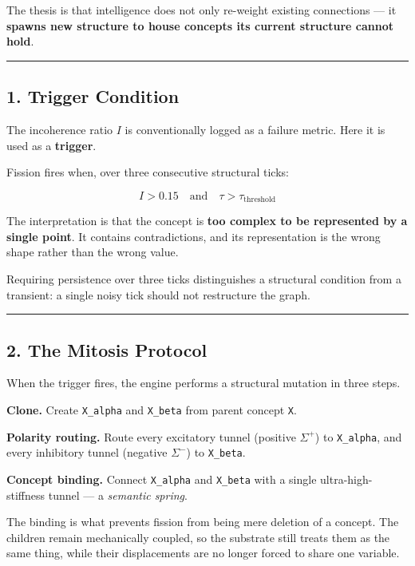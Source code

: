 \documentclass[
  11pt,
  a4paper,
]{article}
\begin{document}
The thesis is that intelligence does not only re-weight existing
connections --- it \textbf{spawns new structure to house concepts its
current structure cannot hold}.

\begin{center}\rule{0.5\linewidth}{0.5pt}\end{center}

\subsection{1. Trigger Condition}\label{trigger-condition}

The incoherence ratio \(I\) is conventionally logged as a failure
metric. Here it is used as a \textbf{trigger}.

Fission fires when, over three consecutive structural ticks:

\[
I > 0.15 \quad\text{and}\quad \tau > \tau_{\text{threshold}}
\]

The interpretation is that the concept is \textbf{too complex to be
represented by a single point}. It contains contradictions, and its
representation is the wrong shape rather than the wrong value.

Requiring persistence over three ticks distinguishes a structural
condition from a transient: a single noisy tick should not restructure
the graph.

\begin{center}\rule{0.5\linewidth}{0.5pt}\end{center}

\subsection{2. The Mitosis Protocol}\label{the-mitosis-protocol}

When the trigger fires, the engine performs a structural mutation in
three steps.

\textbf{Clone.} Create \texttt{X\_alpha} and \texttt{X\_beta} from
parent concept \texttt{X}.

\textbf{Polarity routing.} Route every excitatory tunnel (positive
\(\Sigma^{+}\)) to \texttt{X\_alpha}, and every inhibitory tunnel
(negative \(\Sigma^{-}\)) to \texttt{X\_beta}.

\textbf{Concept binding.} Connect \texttt{X\_alpha} and \texttt{X\_beta}
with a single ultra-high-stiffness tunnel --- a \emph{semantic spring}.

The binding is what prevents fission from being mere deletion of a
concept. The children remain mechanically coupled, so the substrate
still treats them as the same thing, while their displacements are no
longer forced to share one variable.
\end{document}
